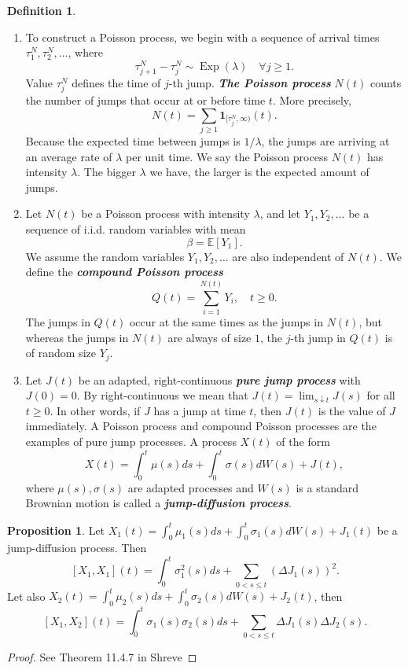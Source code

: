 \documentclass[a4paper,11pt]{book}
\theoremstyle{plain}
\theoremstyle{definition}
\newtheorem{defn}[thm]{Definition}
\newtheorem{prps}[thm]{Proposition}
\newcommand{\ME}{\mathbb{E}}
\newcommand{\define}[1]{\textit{\textbf{#1}}}
\begin{document}
    \begin{defn} \
    	\begin{enumerate}
    		\item To construct a Poisson process, we begin with a sequence of arrival times $\tau_1^N, \tau_2^N, \dots$, where
    		\[ \tau_{j+1}^N - \tau_j^N \sim \operatorname{Exp}(\lambda) \quad \forall j \geq 1.  \]
    		Value $\tau_j^N$ defines the time of $j$-th jump. \define{The Poisson process} $N(t)$ counts the number of jumps that occur at or before time $t$. More precisely,
    		\[ N(t) = \sum_{j \geq 1} \mathbf{1}_{[\tau_j^N, \infty)} (t). \]
    		Because the expected time between jumps is $1/\lambda$, the jumps are arriving at an average rate of $\lambda$ per unit time. We say the Poisson process $N(t)$ has intensity $\lambda$. The bigger $\lambda$ we have, the larger is the expected amount of jumps.
    		\item Let $N(t)$ be a Poisson process with intensity $\lambda$, and let $Y_1, Y_2, \dots$ be a sequence of i.i.d. random variables with mean
    		\[ \beta = \ME[Y_1]. \]
    		We assume the random variables $Y_1, Y_2, \dots$ are also independent of $N(t)$. We define the \define{compound Poisson process}
    		\[ Q(t) = \sum_{i=1}^{N(t)} Y_i, \quad t \geq 0. \]
    		The jumps in $Q(t)$ occur at the same times as the jumps in $N(t)$, but whereas the jumps in $N(t)$ are always of size $1$, the $j$-th jump in $Q(t)$ is of random size $Y_j$.
    		\item
    		Let $J(t)$ be an adapted, right-continuous \define{pure jump process} with $J(0) = 0$. By right-continuous we mean that $J(t) = \lim_{s \downarrow t}J(s)$ for all $t \geq 0$. In other words, if $J$ has a jump at time $t$, then $J(t)$ is the value of $J$ immediately.  A Poisson process and compound Poisson processes are the examples of pure jump processes. A process $X(t)$ of the form
    		\[ X(t) = \int_{0}^t \mu(s)ds + \int_{0}^{t} \sigma(s) dW(s) + J(t), \]
    		where $\mu(s), \sigma(s)$ are adapted processes and $W(s)$ is a standard Brownian motion is called a \define{jump-diffusion process}.
    	\end{enumerate}
    \end{defn}
    
    \begin{prps}
    	Let $X_1(t) = \int_{0}^t \mu_1(s)ds + \int_{0}^{t} \sigma_1(s) dW(s) + J_1(t)$ be a jump-diffusion process. Then
    	\[ [X_1, X_1](t) = \int_0^t \sigma_1^2(s)ds + \sum_{0 < s \leq t} (\Delta J_1(s) )^2. \]
    	Let also $X_2(t) = \int_{0}^t \mu_2(s)ds + \int_{0}^{t} \sigma_2(s) dW(s) + J_2(t)$, then
    	\[ [X_1, X_2](t) = \int_0^t \sigma_1(s) \sigma_2(s) ds + \sum_{0 < s \leq t} \Delta J_1(s)\Delta J_2(s). \]
    \end{prps}
    \begin{proof}
    	See Theorem 11.4.7 in Shreve
    \end{proof}
    
\end{document}
